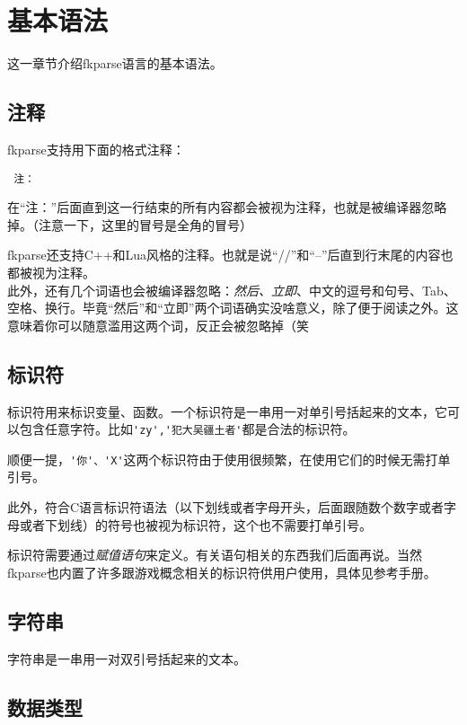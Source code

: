 \chapter{基本语法}

这一章节介绍fkparse语言的基本语法。

\section{注释}

fkparse支持用下面的格式注释：

\begin{verbatim}
 注：
\end{verbatim}

在“注：”后面直到这一行结束的所有内容都会被视为注释，也就是被编译器忽略掉。（注意一下，这里的冒号是全角的冒号）

fkparse还支持C++和Lua风格的注释。也就是说“//”和“--”后直到行末尾的内容也都被视为注释。\\

此外，还有几个词语也会被编译器忽略：\emph{然后、立即}、中文的逗号和句号、Tab、空格、换行。毕竟“然后”和“立即”两个词语确实没啥意义，除了便于阅读之外。这意味着你可以随意滥用这两个词，反正会被忽略掉（笑

\section{标识符}

标识符用来标识变量、函数。一个标识符是一串用一对单引号括起来的文本，它可以包含任意字符。比如\verb|'zy','犯大吴疆土者'|都是合法的标识符。

顺便一提，\verb|'你'、'X'|这两个标识符由于使用很频繁，在使用它们的时候无需打单引号。

此外，符合C语言标识符语法（以下划线或者字母开头，后面跟随数个数字或者字母或者下划线）的符号也被视为标识符，这个也不需要打单引号。

标识符需要通过\textit{赋值语句}来定义。有关语句相关的东西我们后面再说。当然fkparse也内置了许多跟游戏概念相关的标识符供用户使用，具体见参考手册。

\section{字符串}

字符串是一串用一对双引号括起来的文本。

\section{数据类型}

